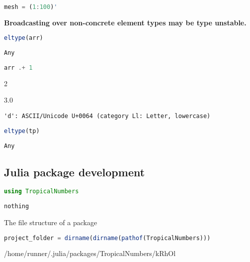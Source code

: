 \documentclass[
  notoc %
]{tufte-book}
\begin{document}
\begin{lstlisting}[language=Julia]
mesh = (1:100)'
\end{lstlisting}

\textbf{Broadcasting over non-concrete element types may be type
unstable.}

\begin{lstlisting}[language=Julia]
eltype(arr)
\end{lstlisting}

\begin{lstlisting}[language=Output]
Any
\end{lstlisting}

\begin{lstlisting}[language=Julia]
arr .+ 1
\end{lstlisting}

2

3.0

\begin{lstlisting}[language=Output]
'd': ASCII/Unicode U+0064 (category Ll: Letter, lowercase)
\end{lstlisting}

\begin{lstlisting}[language=Julia]
eltype(tp)
\end{lstlisting}

\begin{lstlisting}[language=Output]
Any
\end{lstlisting}

\hypertarget{julia-package-development}{%
\subsection{Julia package development}\label{julia-package-development}}

\begin{lstlisting}[language=Julia]
using TropicalNumbers
\end{lstlisting}

\begin{lstlisting}[language=Output]
nothing
\end{lstlisting}

The file structure of a package

\begin{lstlisting}[language=Julia]
project_folder = dirname(dirname(pathof(TropicalNumbers)))
\end{lstlisting}

/home/runner/.julia/packages/TropicalNumbers/kRhOl
\end{document}
